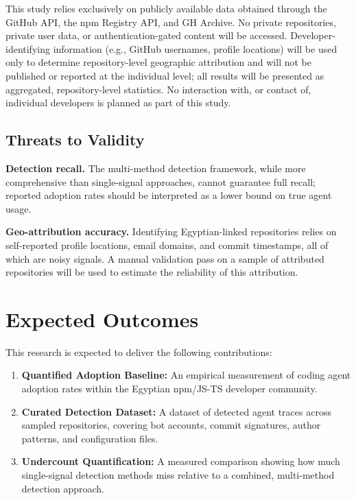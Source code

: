 \documentclass[11pt,a4paper]{article}
\begin{document}
This study relies exclusively on publicly available data obtained through the GitHub API, the npm Registry API, and GH Archive. No private repositories, private user data, or authentication-gated content will be accessed. Developer-identifying information (e.g., GitHub usernames, profile locations) will be used only to determine repository-level geographic attribution and will not be published or reported at the individual level; all results will be presented as aggregated, repository-level statistics. No interaction with, or contact of, individual developers is planned as part of this study.


\subsection{Threats to Validity}

\textbf{Detection recall.} The multi-method detection framework, while more comprehensive than single-signal approaches, cannot guarantee full recall; reported adoption rates should be interpreted as a lower bound on true agent usage.

\textbf{Geo-attribution accuracy.} Identifying Egyptian-linked repositories relies on self-reported profile locations, email domains, and commit timestamps, all of which are noisy signals. A manual validation pass on a sample of attributed repositories will be used to estimate the reliability of this attribution.


\section{Expected Outcomes}
This research is expected to deliver the following contributions:

\begin{enumerate}
    \item \textbf{Quantified Adoption Baseline:} An empirical measurement of coding agent adoption rates within the Egyptian npm/JS-TS developer community.
    \item \textbf{Curated Detection Dataset:} A dataset of detected agent traces across sampled repositories, covering bot accounts, commit signatures, author patterns, and configuration files.
    \item \textbf{Undercount Quantification:} A measured comparison showing how much single-signal detection methods miss relative to a combined, multi-method detection approach.
\end{enumerate}
\end{document}
